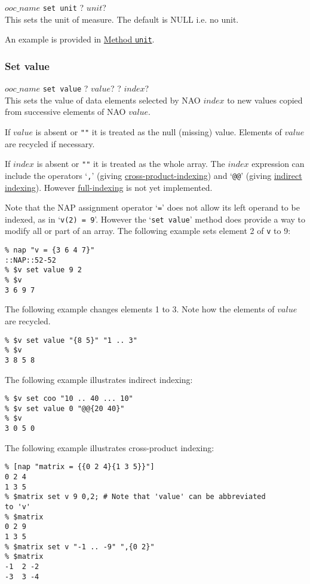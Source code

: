   


  $ooc\_name$ 
  \texttt{set unit} ?
  $unit$?
  \\
  

This sets the unit of measure. The default is NULL i.e. no
  unit.
  

An example is provided in 
  \href{ooc-meta.html\#unit}{Method \texttt{unit}}.
  \subsubsection{
    \label{set-value}Set value
  }

  


  $ooc\_name$ 
  \texttt{set value} ?
  $value$? ?
  $index$?
  \\
  

This sets the value of data elements selected by NAO 
  $index$ to new values copied from successive elements of NAO
  $value$.
  

If 
  $value$ is absent or 
  \texttt{""} it is treated as the null (missing) value.
  Elements of 
  $value$ are recycled if necessary.
  

If 
  $index$ is absent or 
  \texttt{""} it is treated as the whole array. The 
  $index$ expression can include the operators `\texttt{,}' (giving 
  \href{indexing.html\#Cross-product-index}{cross-product-indexing})
  and `\texttt{@@}' (giving 
  \href{indexing.html\#indirect-indexing}{indirect indexing}).
  However 
  \href{indexing.html\#Full-index}{full-indexing} is not yet
  implemented.
  

Note that the NAP assignment operator `\texttt{=}' does not allow its left operand to be indexed,
  as in `\texttt{v(2) = 9}'. However the `\texttt{set value}' method does provide a way to modify all
  or part of an array. The following example sets element 2 of 
  \texttt{v} to 9:
  \begin{verbatim}
% nap "v = {3 6 4 7}"
::NAP::52-52
% $v set value 9 2
% $v
3 6 9 7
\end{verbatim}

  

The following example changes elements 1 to 3. Note how the
  elements of 
  $value$ are recycled.
  \begin{verbatim}
% $v set value "{8 5}" "1 .. 3"
% $v
3 8 5 8
\end{verbatim}

  

The following example illustrates indirect indexing:
  \begin{verbatim}
% $v set coo "10 .. 40 ... 10"
% $v set value 0 "@@{20 40}"
% $v
3 0 5 0
\end{verbatim}

  

The following example illustrates cross-product indexing:
  \begin{verbatim}
% [nap "matrix = {{0 2 4}{1 3 5}}"]
0 2 4
1 3 5
% $matrix set v 9 0,2; # Note that 'value' can be abbreviated
to 'v'
% $matrix
0 2 9
1 3 5
% $matrix set v "-1 .. -9" ",{0 2}"
% $matrix
-1  2 -2
-3  3 -4
\end{verbatim}

